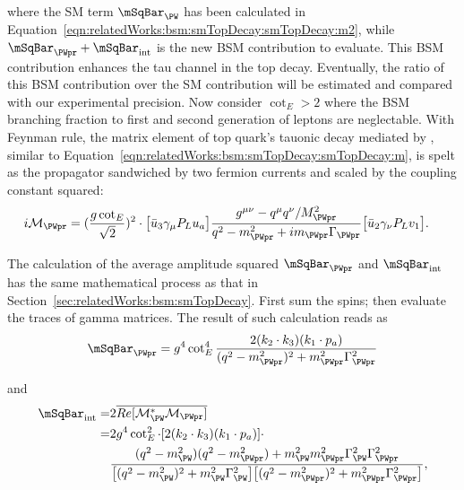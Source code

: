 \noindent where the SM term $\mSqBar _{\PW} $  has been calculated in Equation~\ref{eqn:relatedWorks:bsm:smTopDecay:smTopDecay:m2}, while $\mSqBar _{\PWpr} +  \mSqBar _{\mathrm{int}}$ is the new BSM contribution to evaluate. This BSM contribution enhances the tau channel in the top decay. Eventually, the ratio of this BSM contribution over the SM contribution will be estimated and compared with our experimental precision. Now consider $\cot_E > 2$ where the BSM branching fraction to first and second generation of leptons are neglectable. With Feynman rule, the matrix element of top quark's tauonic decay mediated by \PWpr, similar to Equation~\ref{eqn:relatedWorks:bsm:smTopDecay:smTopDecay:m}, is spelt as the \PWpr propagator sandwiched by two fermion currents and scaled by the coupling constant squared:
\begin{equation}
\begin{split}
	i \mathcal{M}_{\PWpr}  & =  (\frac{g \cot_E}{\sqrt{2}})^2 \cdot 
	\big[ \bar{u}_3 \gamma_\mu P_L u_a \big] 
	\frac{g^{\mu \nu} - q^\mu q^\nu/M^2_{\PWpr}}{q^2-m^2_{\PWpr} + i m_{\PWpr} \Gamma_{\PWpr}} 
	\big[ \bar{u}_2 \gamma_\nu P_L v_1 \big] .
\end{split}
\end{equation}

\noindent The calculation of the average amplitude squared  $\mSqBar _{\PWpr} $ and $\mSqBar _{\mathrm{int}}$ has the same mathematical process as that in Section~\ref{sec:relatedWorks:bsm:smTopDecay}. First sum the spins; then evaluate the traces of gamma matrices. The result of such calculation reads as
\begin{equation}
	\mSqBar_{\PWpr} =  g^4 \cot_E^4 \frac{2  (  k_2 \cdot k_3) (  k_1 \cdot p_a) }{ (  q^2-m^2_{\PWpr})^2 +  m^2_{\PWpr} \Gamma^2_{\PWpr} }  
\end{equation}

\noindent and
\begin{equation}
\begin{split}
    \mSqBar _{\mathrm{int}} = &   2 \overline{ Re[\mathcal{M}^*_{\PW} \mathcal{M}_{\PWpr}] }  \\
    =& 2 g ^4\cot^2_E  \cdot  [2  (  k_2 \cdot k_3) (  k_1 \cdot p_a) ] \cdot \\
    &\frac 
    {( q^2-m^2_{\PW}) ( q^2-m^2_{\PWpr}) + m^2_{\PW}  m^2_{\PWpr}  \Gamma^2_{\PW} \Gamma^2_{\PWpr} }
    { \big[ ( q^2-m^2_{\PW})^2 +  m^2_{\PW} \Gamma^2_{\PW} \big] \big[ (  q^2-m^2_{\PWpr})^2 +  m^2_{\PWpr} \Gamma^2_{\PWpr} \big] }   
    ,
\end{split}
\end{equation}


